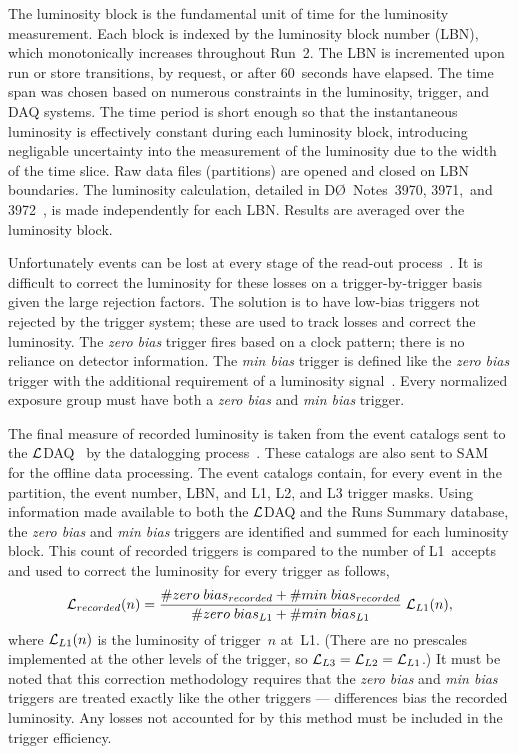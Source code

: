\documentclass[12pt]{article}
\begin{document}
The luminosity block is the fundamental unit of time for the
luminosity measurement.  Each block is indexed by the luminosity block
number (LBN), which monotonically increases throughout Run~2.  The LBN
is incremented upon run or store transitions, by request, or after
60~seconds have elapsed.  The time span was chosen based on numerous
constraints in the luminosity, trigger, and DAQ systems.  The time
period is short enough so that the instantaneous luminosity is
effectively constant during each luminosity block, introducing
negligable uncertainty into the measurement of the luminosity due to
the width of the time slice.  Raw data files (partitions) are opened
and closed on LBN boundaries.  The luminosity calculation, detailed in
D\O~Notes~3970, 3971,~and 3972~\cite{3970,3971,3972}, is made
independently for each LBN.  Results are averaged over the luminosity
block.

Unfortunately events can be lost at every stage of the read-out
process~\cite{3972}.  It is difficult to correct the luminosity for
these losses on a trigger-by-trigger basis given the large rejection
factors.  The solution is to have low-bias triggers not rejected by
the trigger system; these are used to track losses and correct the
luminosity.  The {\it zero bias} trigger fires based on a clock
pattern; there is no reliance on detector information.  The {\it min
bias} trigger is defined like the {\it zero bias} trigger with the
additional requirement of a luminosity signal~\cite{3973}.  Every
normalized exposure group must have both a {\it zero bias} and {\it
min bias} trigger.

The final measure of recorded luminosity is taken from the event
catalogs sent to the $\cal L$DAQ~\cite{XXXX-LDAQ} by the datalogging
process~\cite{3982}.  These catalogs are also sent to SAM~\cite{3465}
for the offline data processing.  The event catalogs contain, for
every event in the partition, the event number, LBN, and L1, L2, and
L3 trigger masks.  Using information made available to both the $\cal
L$DAQ and the Runs Summary database, the {\it zero bias} and {\it min
bias} triggers are identified and summed for each luminosity block.
This count of recorded triggers is compared to the number of
L1~accepts and used to correct the luminosity for every trigger as
follows,
\begin{equation}
{\cal L}_{recorded}(n) = {\# zero\;bias_{recorded} + \#
min\;bias_{recorded} \over \# zero\;bias_{L1} + \# min\;bias_{L1}}
\;{\cal L}_{L1}(n),
\label{eq:recorded}
\end{equation}
where ${\cal L}_{L1}(n)$ is the luminosity of trigger~$n$
at~L1. (There are no prescales implemented at the other levels of the
trigger, so ${\cal L}_{L3} = {\cal L}_{L2} = {\cal L}_{L1}$.)  It must
be noted that this correction methodology requires that the {\it zero
bias} and {\it min bias} triggers are treated exactly like the other
triggers --- differences bias the recorded luminosity.  Any losses not
accounted for by this method must be included in the trigger
efficiency.
\end{document}
